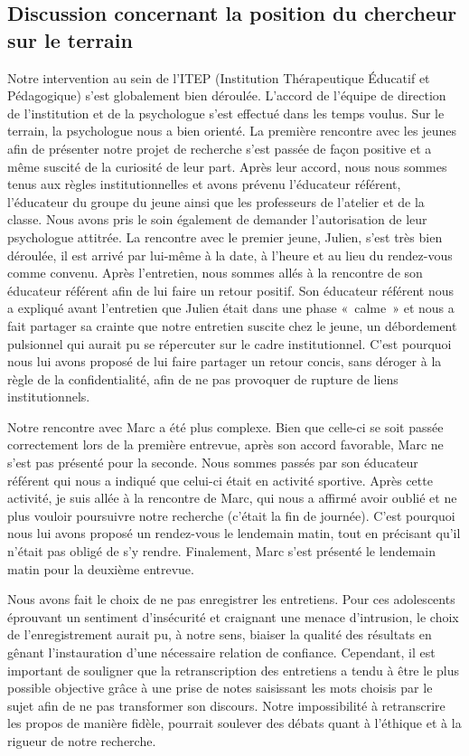 \documentclass[12pt, a4paper]{book}
\begin{document}
\begin{spacing}{1.5}
\section{Discussion concernant la position du chercheur sur le terrain}

Notre intervention au sein de l'ITEP (Institution Thérapeutique Éducatif et Pédagogique) s'est globalement bien déroulée. L'accord de l'équipe de direction de l'institution et de la psychologue s'est effectué dans les temps voulus. Sur le terrain, la psychologue nous a bien orienté. La première rencontre avec les jeunes afin de présenter notre projet de recherche s'est passée de façon positive et a même suscité de la curiosité de leur part. Après leur accord, nous nous sommes tenus aux règles institutionnelles et avons prévenu l'éducateur référent, l'éducateur du groupe du jeune ainsi que les professeurs de l'atelier et de la classe. Nous avons pris le soin également de demander l'autorisation de leur psychologue attitrée. La rencontre avec le premier jeune, Julien, s'est très bien déroulée, il est arrivé par lui-même à la date, à l'heure et au lieu du rendez-vous comme convenu. Après l'entretien, nous sommes allés à la rencontre de son éducateur référent afin de lui faire un retour positif. Son éducateur référent nous a expliqué avant l'entretien que Julien était dans une phase « calme » et nous a fait partager sa crainte que notre entretien suscite chez le jeune, un débordement pulsionnel qui aurait pu se répercuter sur le cadre institutionnel. C'est pourquoi nous lui avons proposé de lui faire partager un retour concis, sans déroger à la règle de la confidentialité, afin de ne pas provoquer de rupture de liens institutionnels. 

Notre rencontre avec Marc  a été plus complexe. Bien que celle-ci se soit passée correctement lors de la première entrevue, après son accord favorable, Marc ne s'est pas présenté pour la seconde. Nous sommes passés par son éducateur référent qui nous a indiqué que celui-ci était en activité sportive. Après cette activité, je suis allée à la rencontre de Marc, qui nous a affirmé avoir oublié et ne plus vouloir poursuivre notre recherche (c'était la fin de journée). C'est pourquoi nous lui avons proposé un rendez-vous le lendemain matin, tout en précisant qu'il n'était pas obligé de s'y rendre. Finalement, Marc s'est présenté le lendemain matin pour la deuxième entrevue.

Nous avons fait le choix de ne pas enregistrer les entretiens. Pour ces adolescents éprouvant un sentiment d'insécurité et craignant une menace d'intrusion, le choix de l'enregistrement aurait pu, à notre sens, biaiser la qualité des résultats en gênant  l'instauration d'une nécessaire relation de confiance.  Cependant, il est important de souligner que la retranscription des entretiens a tendu à être le plus possible objective grâce à une prise de notes saisissant les mots choisis par le sujet afin de ne pas transformer son discours. Notre impossibilité à retranscrire les propos de manière fidèle, pourrait soulever des débats quant à l'éthique et à la rigueur de notre recherche.


\end{spacing}
\end{document}
